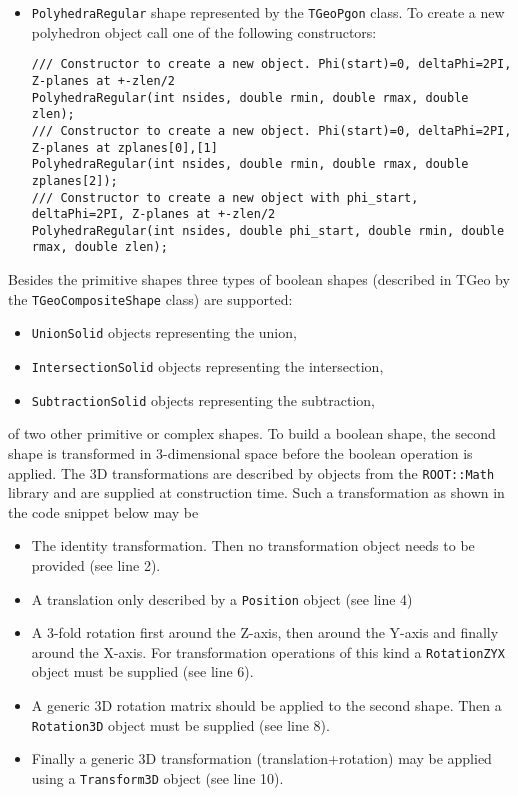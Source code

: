 \begin{itemize}
\begin{verbatim}
\end{verbatim}
\item \texttt{PolyhedraRegular} shape represented by the \texttt{TGeoPgon} class. To create a new polyhedron object call one of the following constructors:
\begin{verbatim}
/// Constructor to create a new object. Phi(start)=0, deltaPhi=2PI, Z-planes at +-zlen/2
PolyhedraRegular(int nsides, double rmin, double rmax, double zlen);
/// Constructor to create a new object. Phi(start)=0, deltaPhi=2PI, Z-planes at zplanes[0],[1]
PolyhedraRegular(int nsides, double rmin, double rmax, double zplanes[2]);
/// Constructor to create a new object with phi_start, deltaPhi=2PI, Z-planes at +-zlen/2
PolyhedraRegular(int nsides, double phi_start, double rmin, double rmax, double zlen);
\end{verbatim}
\end{itemize}

Besides the primitive shapes three types of boolean shapes (described in TGeo by the \texttt{TGeoCompositeShape} class) are supported:

\begin{itemize}
\item \texttt{UnionSolid} objects representing the union,
\item \texttt{IntersectionSolid} objects representing the intersection,
\item \texttt{SubtractionSolid} objects representing the subtraction,
\end{itemize}

of two other primitive or complex shapes. To build a boolean shape, the second shape is transformed in 3-dimensional space before the boolean operation is applied. The 3D transformations are described by objects from the \texttt{ROOT::Math} library and are supplied at construction time.  Such a transformation as shown in the code snippet below may be 

\begin{itemize}
\item The identity transformation. Then no transformation object needs to be provided (see line 2).
\item A translation only described by a \texttt{Position} object (see line 4)
\item A 3-fold rotation first around the Z-axis, then around the Y-axis and finally around the X-axis. For transformation operations of this kind a \texttt{RotationZYX} object must be supplied (see line 6).
\item A generic 3D rotation matrix should be applied to the second shape. Then a \texttt{Rotation3D} object must be supplied (see line 8).
\item Finally a generic 3D transformation (translation+rotation) may be applied using a \texttt{Transform3D} object (see line 10).
\end{itemize}

